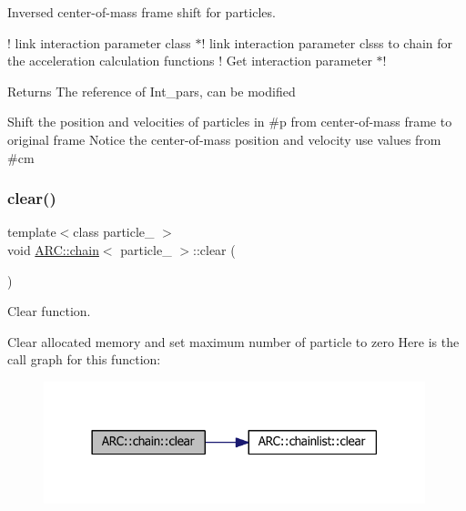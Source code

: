 Inversed center-\/of-\/mass frame shift for particles. 

! link interaction parameter class $\ast$! link interaction parameter clsss to chain for the acceleration calculation functions ! Get interaction parameter $\ast$! \begin{DoxyReturn}{Returns}
The reference of Int\+\_\+pars, can be modified
\end{DoxyReturn}
Shift the position and velocities of particles in \#p from center-\/of-\/mass frame to original frame Notice the center-\/of-\/mass position and velocity use values from \#cm \hypertarget{classARC_1_1chain_a4cf8d7e8253d71ce0110fb827add1b32}{}\label{classARC_1_1chain_a4cf8d7e8253d71ce0110fb827add1b32} 
\subsubsection{\texorpdfstring{clear()}{clear()}}
{\footnotesize\ttfamily template$<$class particle\+\_\+ $>$ \\
void \hyperlink{classARC_1_1chain}{A\+R\+C\+::chain}$<$ particle\+\_\+ $>$\+::clear (\begin{DoxyParamCaption}{ }\end{DoxyParamCaption})\hspace{0.3cm}{\ttfamily [inline]}}



Clear function. 

Clear allocated memory and set maximum number of particle to zero Here is the call graph for this function\+:
\nopagebreak
\begin{figure}[H]
\begin{center}
\leavevmode
\includegraphics[width=314pt]{classARC_1_1chain_a4cf8d7e8253d71ce0110fb827add1b32_cgraph}
\end{center}
\end{figure}
\hypertarget{classARC_1_1chain_a6caef2b2dc81cc944377a3ea511c0fe8}{}\label{classARC_1_1chain_a6caef2b2dc81cc944377a3ea511c0fe8} 
